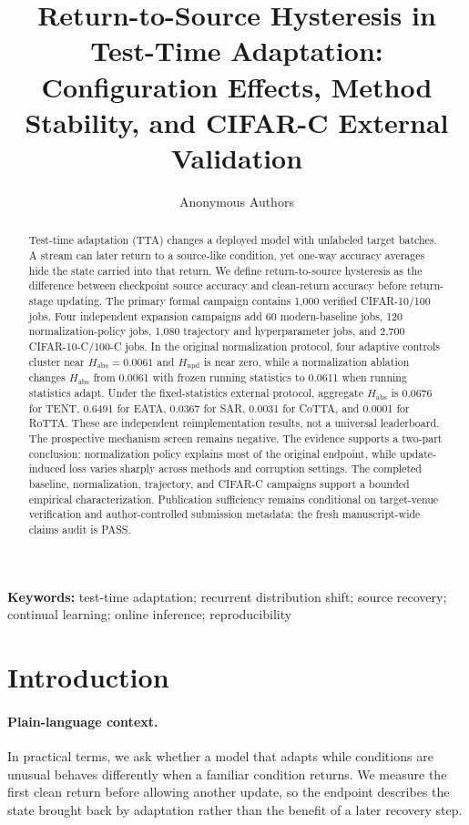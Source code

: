 \documentclass[11pt]{article}
\title{Return-to-Source Hysteresis in Test-Time Adaptation:\\
Configuration Effects, Method Stability, and CIFAR-C External Validation}
\author{Anonymous Authors}
\date{}
\begin{document}
\maketitle

\begin{abstract}
Test-time adaptation (TTA) changes a deployed model with unlabeled target batches. A stream can later return to a source-like condition, yet one-way accuracy averages hide the state carried into that return. We define return-to-source hysteresis as the difference between checkpoint source accuracy and clean-return accuracy before return-stage updating. The primary formal campaign contains 1,000 verified CIFAR-10/100 jobs. Four independent expansion campaigns add 60 modern-baseline jobs, 120 normalization-policy jobs, 1,080 trajectory and hyperparameter jobs, and 2,700 CIFAR-10-C/100-C jobs. In the original normalization protocol, four adaptive controls cluster near $H_{\mathrm{abs}}=0.0061$ and $H_{\mathrm{upd}}$ is near zero, while a normalization ablation changes $H_{\mathrm{abs}}$ from 0.0061 with frozen running statistics to 0.0611 when running statistics adapt. Under the fixed-statistics external protocol, aggregate $H_{\mathrm{abs}}$ is 0.0676 for TENT, 0.6491 for EATA, 0.0367 for SAR, 0.0031 for CoTTA, and 0.0001 for RoTTA. These are independent reimplementation results, not a universal leaderboard. The prospective mechanism screen remains negative. The evidence supports a two-part conclusion: normalization policy explains most of the original endpoint, while update-induced loss varies sharply across methods and corruption settings. The completed baseline, normalization, trajectory, and CIFAR-C campaigns support a bounded empirical characterization. Publication sufficiency remains conditional on target-venue verification and author-controlled submission metadata; the fresh manuscript-wide claims audit is PASS.
\end{abstract}

\noindent\textbf{Keywords:} test-time adaptation; recurrent distribution shift; source recovery; continual learning; online inference; reproducibility

\section{Introduction}
\label{sec:intro}

\paragraph{Plain-language context.}
In practical terms, we ask whether a model that adapts while conditions are unusual behaves differently when a familiar condition returns. We measure the first clean return before allowing another update, so the endpoint describes the state brought back by adaptation rather than the benefit of a later recovery step.
\end{document}
